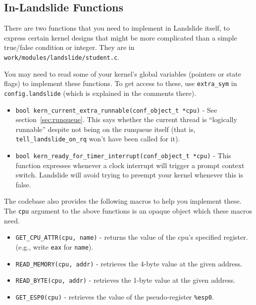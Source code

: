 \documentclass{article}
\begin{document}
\subsection{In-Landslide Functions}
\label{sec:student}

There are two functions that you need to implement in Landslide itself, to express certain kernel designs that might be more complicated than a simple true/false condition or integer. They are in \\ \texttt{work/modules/landslide/student.c}.

You may need to read some of your kernel's global variables (pointers or state flags) to implement these functions. To get access to these, use \texttt{extra\_sym} in \texttt{config.landslide} (which is explained in the comments there).

\begin{itemize}
	\item \texttt{bool kern\_current\_extra\_runnable(conf\_object\_t *cpu)} - See section~\ref{sec:runqueue}. This says whether the current thread is ``logically runnable'' despite not being on the runqueue itself (that is, \texttt{tell\_landslide\_on\_rq} won't have been called for it).
	\item \texttt{bool kern\_ready\_for\_timer\_interrupt(conf\_object\_t *cpu)} - This function expresses whenever a clock interrupt will trigger a prompt context switch. Landslide will avoid trying to preempt your kernel whenever this is false.
\end{itemize}
The codebase also provides the following macros to help you implement these. The \texttt{cpu} argument to the above functions is an opaque object which these macros need.
\begin{itemize}
	\item \texttt{GET\_CPU\_ATTR(cpu, name)} - returns the value of the cpu's specified register. (e.g., write \texttt{eax} for \texttt{name}).
	\item \texttt{READ\_MEMORY(cpu, addr)} - retrieves the 4-byte value at the given address.
	\item \texttt{READ\_BYTE(cpu, addr)} - retrieves the 1-byte value at the given address.
	\item \texttt{GET\_ESP0(cpu)} - retrieves the value of the pseudo-register \texttt{\%esp0}.
\end{itemize}

\end{document}
